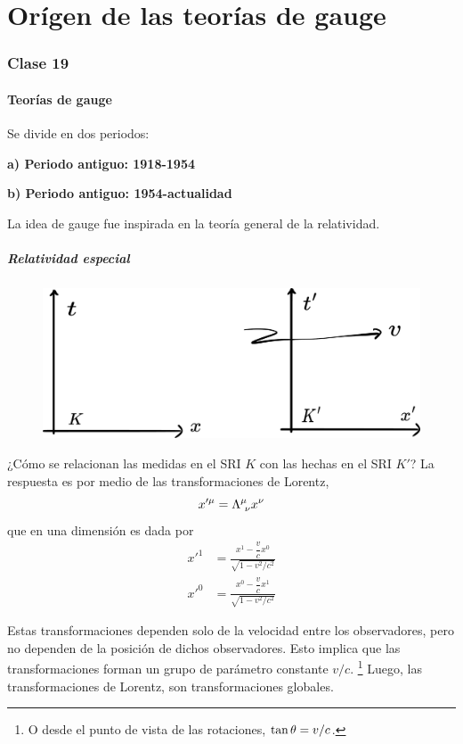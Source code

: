 \part{Orígen de las teorías de gauge}
\section{Clase 19}
\subsection{Teorías de gauge}
Se divide en dos periodos:

\textbf{a) Periodo antiguo: 1918-1954}

\textbf{b) Periodo antiguo: 1954-actualidad}

La idea de gauge fue inspirada en la teoría general de la relatividad.

\subsubsection{Relatividad especial}

\begin{figure}[h!]
	\centering
	\includegraphics[scale=0.2]{fig/Galileo.pdf}
\end{figure}

¿Cómo se relacionan las medidas en el SRI $K$ con las hechas en el SRI $K'$? La respuesta es por medio de las transformaciones de Lorentz,
\begin{equation}
  x'^\mu =\Lambda^\mu_{~\nu } x^\nu 
\end{equation}
que en una dimensión es dada por
\begin{align}
  x'^1&=\frac{x^1-\dfrac{v}{c}x^0}{\sqrt{1-v^2/c^2}}\\
  x'^0&=\frac{x^0-\dfrac{v}{c}x^1}{\sqrt{1-v^2/c^2}}
\end{align}

Estas transformaciones dependen solo de la velocidad entre los observadores, pero no dependen de la posición de dichos observadores. Esto implica que las transformaciones forman un grupo de parámetro constante $v/c$. \footnote{O desde el punto de vista de las rotaciones, $\tan\theta =v/c$.} Luego, las transformaciones de Lorentz, son transformaciones globales.

